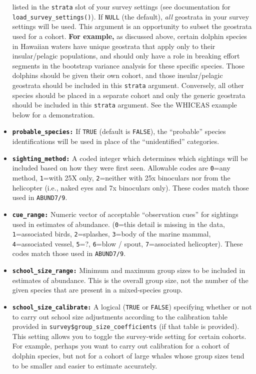 \documentclass[
]{book}
\begin{document}
\begin{itemize}
  listed in the \texttt{strata} slot of your survey settings (see documentation for \texttt{load\_survey\_settings()}). If \texttt{NULL} (the default), \emph{all} geostrata in your survey settings will be used. This argument is an opportunity to subset the geostrata used for a cohort. \textbf{For example,} as discussed above, certain dolphin species in Hawaiian waters have unique geostrata that apply only to their insular/pelagic populations, and should only have a role in breaking effort segments in the bootstrap variance analysis for these specific species. Those dolphins should be given their own cohort, and those insular/pelagic geostrata should be included in this \texttt{strata} argument. Conversely, all other species should be placed in a separate cohort and only the generic geostrata should be included in this \texttt{strata} argument. See the WHICEAS example below for a demonstration.
\item
  \textbf{\texttt{probable\_species:}} If \texttt{TRUE} (default is \texttt{FALSE}), the ``probable'' species identifications will be used in place of the ``unidentified'' categories.
\item
  \textbf{\texttt{sighting\_method:}} A coded integer which determines which sightings will be included based on how they were first seen. Allowable codes are \texttt{0}=any method, \texttt{1}=with 25X only, \texttt{2}=neither with 25x binoculars nor from the helicopter (i.e., naked eyes and 7x binoculars only). These codes match those used in \texttt{ABUND7/9}.
\item
  \textbf{\texttt{cue\_range:}} Numeric vector of acceptable ``observation cues'' for sightings used in estimates of abundance. (\texttt{0}=this detail is missing in the data, \texttt{1}=associated birds, \texttt{2}=splashes, \texttt{3}=body of the marine mammal, \texttt{4}=associated vessel, \texttt{5}=?, \texttt{6}=blow / spout, \texttt{7}=associated helicopter). These codes match those used in \texttt{ABUND7/9}.
\item
  \textbf{\texttt{school\_size\_range:}} Minimum and maximum group sizes to be included in estimates of abundance. This is the overall group size, not the number of the given species that are present in a mixed-species group.
\item
  \textbf{\texttt{school\_size\_calibrate:}} A logical (\texttt{TRUE} or \texttt{FALSE}) specifying whether or not to carry out school size adjustments according to the calibration table provided in \texttt{survey\$group\_size\_coefficients} (if that table is provided). This setting allows you to toggle the survey-wide setting for certain cohorts. For example, perhaps you want to carry out calibration for a cohort of dolphin species, but not for a cohort of large whales whose group sizes tend to be smaller and easier to estimate accurately.

\end{itemize}
\end{document}
